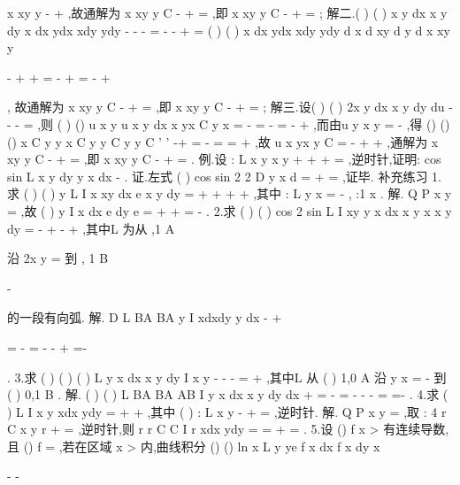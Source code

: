 \int 
\int 
\int 
x
xy
y
-
+
,故通解为
x
xy
y
C
-
+
=
,即
x
xy
y
C
-
+
=
; 
解二.(
)
(
)
x
y dx
x
y dy
x dx
ydx
xdy
ydy
-
-
-
=
-
-
+
= 
(
)
(
)
x dx
ydx
xdy
ydy
d
x
d xy
d
y
d
x
xy
y






-
+
+
=
-
+
=
-
+












, 
故通解为
x
xy
y
C
-
+
=
,即
x
xy
y
C
-
+
=
; 
解三.设(
)
(
)
2x
y dx
x
y dy
du
-
-
-
=
,则 
(
)
()
u
x
y
u
x
y dx
x
yx
C y
x
\partial 
=
-
\Rightarrow 
=
-
=
-
+
\partial 
\int 
,而由u
y
x
y
\partial 
=
-
\partial 
,得 
()
()
()
x
C
y
y
x
C
y
y
C y
y
C
'
'
-+
=
-
\Rightarrow 
=
\Rightarrow 
=
+
,故 
u
x
yx
y
C
=
-
+
+
,通解为
x
xy
y
C
-
+
=
,即
x
xy
y
C
-
+
=
. 
\textcolor{lyred}{例}.设
:
L x
y
x
y
+
+
+
=
,逆时针,证明:
cos
sin
L
x
y dy
y
x dx
\pi 
-
\le 
\int \nabla 
. 
证.左式
(
)
cos
sin
2 2
D
y
x
d
\pi 
\pi 
\sigma 
=
+
\le 
\cdots 
=
\int \int 
,证毕. 
\textcolor{lyred}{补充练习 }
1.求
(
)
(
)
y
L
I
x
xy
dx
e
x y dy
=
+
+
+
+
\int 
,其中
:
L y
x
=
-
,
:1
x
\to 
. 
解. Q
P
x
y
\partial 
\partial 
=
\partial 
\partial ,故
(
)
y
I
x
dx
e dy
e
=
+
+
=
-
\int 
\int 
. 
2.求
(
)
(
)
cos
2 sin
L
I
xy
y
x dx
x
y
x
x y
dy
=
-
+
-
+
\int 
,其中L 为从
,1
A \pi 






沿 
2x
y
\pi 
=
到
, 1
B \pi 


-




的一段有向弧. 
解.
D
L BA
BA
y
I
xdxdy
y
dx
\pi 
\pi 
\pi 
-
+


=
-
=
-
-
+
=-




\int 
\int 
\int \int 
\int 
\nabla 
. 
3.求
(
)
(
)
(
)
L
y
x dx
x
y dy
I
x
y
-
-
-
=
+
\int 
,其中L 从
(
)
1,0
A
沿
y
x
=
-
到
(
)
0,1
B
. 
解.
(
)
(
)
L BA
BA
AB
I
y
x dx
x
y dy
dx
+
=
-
=
-
-
-
=
\cdots 
=-
\int 
\int 
\int 
\int 
\nabla 
. 
4.求
(
)
L
I
x
y
xdx
ydy
=
+
+
\int \nabla 
,其中
(
)
:
L
x
y
-
+
=
,逆时针. 
解. Q
P
x
y
\partial 
\partial 
=
\partial 
\partial ,取
: 4
r
C
x
y
r
+
=
,逆时针,则
r
r
C
C
I
r
xdx
ydy
=
=
+
=
\int 
\int 
\nabla 
\nabla 
. 
5.设
()
f x >
有连续导数,且
()
f
=
,若在区域
x >
内,曲线积分 
()
()
ln
x
L
y
ye f x
dx
f x dy
x


-
-




